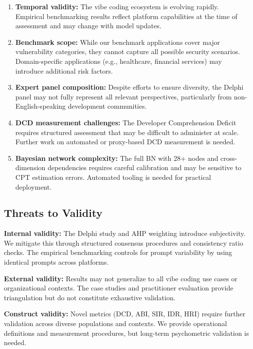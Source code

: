 \documentclass[preprint,review,12pt]{elsarticle}
\begin{document}
\begin{enumerate}
    \item \textbf{Temporal validity:} The vibe coding ecosystem is evolving rapidly. Empirical benchmarking results reflect platform capabilities at the time of assessment and may change with model updates.

    \item \textbf{Benchmark scope:} While our benchmark applications cover major vulnerability categories, they cannot capture all possible security scenarios. Domain-specific applications (e.g., healthcare, financial services) may introduce additional risk factors.

    \item \textbf{Expert panel composition:} Despite efforts to ensure diversity, the Delphi panel may not fully represent all relevant perspectives, particularly from non-English-speaking development communities.

    \item \textbf{DCD measurement challenges:} The Developer Comprehension Deficit requires structured assessment that may be difficult to administer at scale. Further work on automated or proxy-based DCD measurement is needed.

    \item \textbf{Bayesian network complexity:} The full BN with 28+ nodes and cross-dimension dependencies requires careful calibration and may be sensitive to CPT estimation errors. Automated tooling is needed for practical deployment.
\end{enumerate}


\subsection{Threats to Validity}
\label{subsec:threats}

\textbf{Internal validity:} The Delphi study and AHP weighting introduce subjectivity. We mitigate this through structured consensus procedures and consistency ratio checks. The empirical benchmarking controls for prompt variability by using identical prompts across platforms.

\textbf{External validity:} Results may not generalize to all vibe coding use cases or organizational contexts. The case studies and practitioner evaluation provide triangulation but do not constitute exhaustive validation.

\textbf{Construct validity:} Novel metrics (DCD, ABI, SIR, IDR, HRI) require further validation across diverse populations and contexts. We provide operational definitions and measurement procedures, but long-term psychometric validation is needed.
\end{document}
